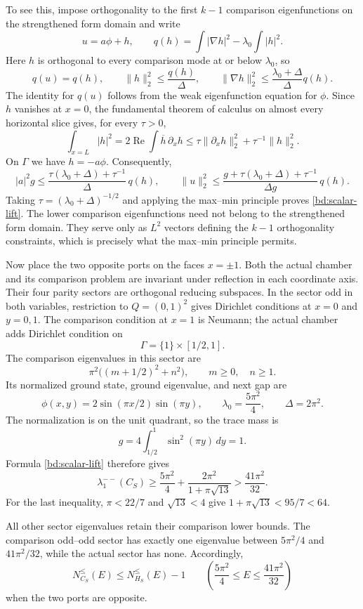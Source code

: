 \documentclass[11pt,reqno]{amsart}
\numberwithin{equation}{section}
\begin{document}
To see this, impose orthogonality to the first $k-1$ comparison
eigenfunctions on the strengthened form domain and write
\[
 u=a\phi+h,\qquad
 q(h)=\int|\nabla h|^2-\lambda_0\int|h|^2.
\]
Here $h$ is orthogonal to every comparison mode at or below
$\lambda_0$, so
\[
 q(u)=q(h),\qquad
 \|h\|_2^2\le\frac{q(h)}\Delta,\qquad
 \|\nabla h\|_2^2\le\frac{\lambda_0+\Delta}{\Delta}q(h).
\]
The identity for $q(u)$ follows from the weak eigenfunction equation for
$\phi$. Since $h$ vanishes at $x=0$, the fundamental theorem of calculus
on almost every horizontal slice gives, for every $\tau>0$,
\[
 \int_{x=L}|h|^2
 =2\operatorname{Re}\int \overline h\,\partial_xh
 \le\tau\|\partial_xh\|_2^2+\tau^{-1}\|h\|_2^2.
\]
On $\Gamma$ we have $h=-a\phi$. Consequently,
\[
 |a|^2g
 \le\frac{\tau(\lambda_0+\Delta)+\tau^{-1}}{\Delta}\,q(h),
 \qquad
 \|u\|_2^2
 \le\frac{g+\tau(\lambda_0+\Delta)+\tau^{-1}}{\Delta g}\,q(h).
\]
Taking $\tau=(\lambda_0+\Delta)^{-1/2}$ and applying the max--min
principle proves \eqref{bd:scalar-lift}. The lower comparison
eigenfunctions need not belong to the strengthened form domain. They
serve only as $L^2$ vectors defining the $k-1$ orthogonality constraints,
which is precisely what the max--min principle permits.

Now place the two opposite ports on the faces $x=\pm1$. Both the actual
chamber and its comparison problem are invariant under reflection in
each coordinate axis. Their four parity sectors are orthogonal reducing
subspaces. In the sector odd in both variables, restriction to
$Q=(0,1)^2$ gives Dirichlet conditions at $x=0$ and $y=0,1$. The
comparison condition at $x=1$ is Neumann; the actual chamber adds
Dirichlet condition on
\[
 \Gamma=\{1\}\times[1/2,1].
\]
The comparison eigenvalues in this sector are
\[
 \pi^2\bigl((m+1/2)^2+n^2\bigr),\qquad m\ge0,\quad n\ge1.
\]
Its normalized ground state, ground eigenvalue, and next gap are
\[
 \phi(x,y)=2\sin(\pi x/2)\sin(\pi y),\qquad
 \lambda_0=\frac{5\pi^2}{4},\qquad
 \Delta=2\pi^2.
\]
The normalization is on the unit quadrant, so the trace mass is
\[
 g=4\int_{1/2}^1\sin^2(\pi y)\,dy=1.
\]
Formula \eqref{bd:scalar-lift} therefore gives
\begin{equation}
 \lambda_1^{--}(C_S)
 \ge\frac{5\pi^2}{4}+\frac{2\pi^2}{1+\pi\sqrt{13}}
 >\frac{41\pi^2}{32}.
 \label{bd:opposite-lift}
\end{equation}
For the last inequality, $\pi<22/7$ and $\sqrt{13}<4$ give
$1+\pi\sqrt{13}<95/7<64$.

All other sector eigenvalues retain their comparison lower bounds.
The comparison odd--odd sector has exactly one eigenvalue between
$5\pi^2/4$ and $41\pi^2/32$, while the actual sector has none.
Accordingly,
\begin{equation}
 N_{C_S}^{\le}(E)\le N_{H_S}^{\le}(E)-1
 \qquad
 \left(\frac{5\pi^2}{4}\le E\le\frac{41\pi^2}{32}\right)
 \label{bd:opposite-count}
\end{equation}
when the two ports are opposite.
\end{document}
